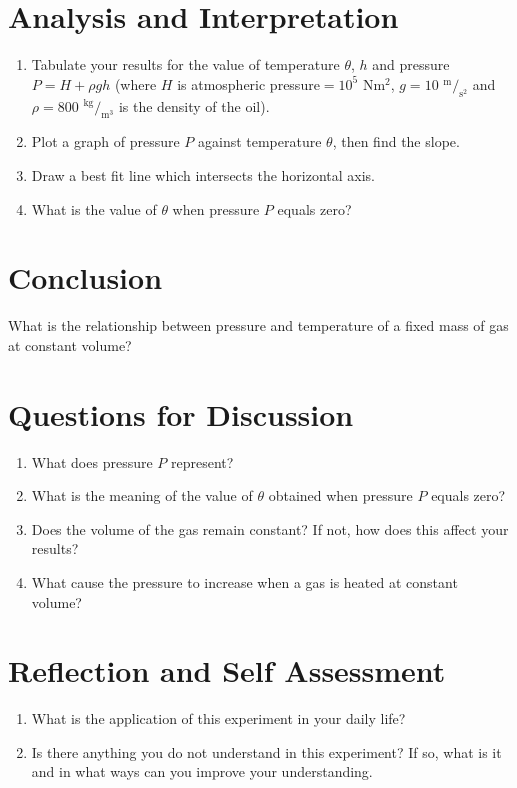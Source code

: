 \section{Analysis and Interpretation}
\begin{enumerate}
\item Tabulate your results for the value of temperature $\theta$, $h$ and pressure $P=H +\rho gh$ (where $H$ is atmospheric pressure$ = 10^5$ Nm$^2$, $g = 10$ $^{\text{m}}/_{\text{s}^2}$ and $\rho = 800$ $^{\text{kg}}/_{\text{m}^3}$ is the density of the oil).
\item Plot a graph of pressure $P$ against temperature $\theta$, then find the slope.
\item Draw a best fit line which intersects the horizontal axis.
\item What is the value of $\theta$ when pressure $P$ equals zero?
\end{enumerate}

\section{Conclusion}
What is the relationship between pressure and temperature of a fixed mass of gas at constant volume?

\section{Questions for Discussion}
\begin{enumerate}
\item What does pressure $P$ represent?
\item What is the meaning of the value of $\theta$ obtained when pressure $P$ equals zero?
\item Does the volume of the gas remain constant? If not, how does this affect your results?
\item What cause the pressure to increase when a gas is heated at constant volume?
\end{enumerate}

\section{Reflection and Self Assessment}
\begin{enumerate}
\item What is the application of this experiment in your daily life?
\item Is there anything you do not understand in this experiment? If so, what is it and in what ways can you improve your understanding.
\end{enumerate}